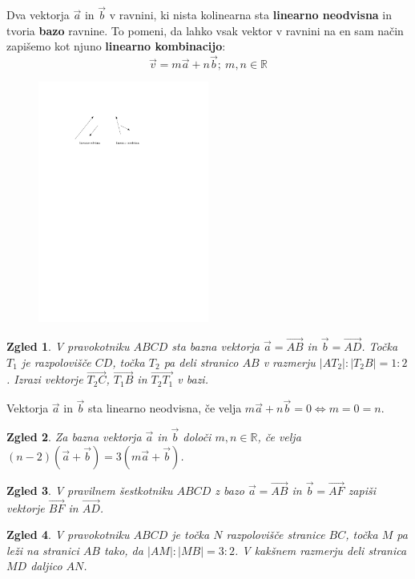 \documentclass{article}
\newtheorem*{zgled}{Zgled}
\begin{document}
Dva vektorja $\vec{a}$ in $\vec{b}$ v ravnini, ki nista kolinearna sta \textbf{linearno neodvisna} in tvoria \textbf{bazo} ravnine. To pomeni, da lahko vsak vektor v ravnini na en sam način zapišemo kot njuno \textbf{linearno kombinacijo}:
\[\vec{v}=m\vec{a}+n\vec{b};\ m,n\in\mathbb{R}\]

\begin{figure}[H]
    \includegraphics[width=0.5\textwidth]{odvisnost.pdf}
    \centering
\end{figure}

\begin{zgled}
    V pravokotniku $ABCD$ sta bazna vektorja $\vec{a}=\vec{AB}$ in $\vec{b}=\vec{AD}$. Točka $T_1$ je razpolovišče $CD$, točka $T_2$ pa deli stranico $AB$ v razmerju $|AT_2|:|T_2 B|=1:2$. Izrazi vektorje $\vec{T_2 C}$, $\vec{T_1 B}$ in $\vec{T_2 T_1}$ v bazi.
\end{zgled}

Vektorja $\vec{a}$ in $\vec{b}$ sta linearno neodvisna, če velja $m\vec{a}+n\vec{b}=0 \iff m=0=n$.

\begin{zgled}
    Za bazna vektorja $\vec{a}$ in $\vec{b}$ določi $m,n\in\mathbb{R}$, če velja $(n-2)(\vec{a}+\vec{b})=3(m\vec{a}+\vec{b})$.
\end{zgled}

\begin{zgled}
    V pravilnem šestkotniku $ABCD$ z bazo $\vec{a}=\vec{AB}$ in $\vec{b}=\vec{AF}$ zapiši vektorje $\vec{BF}$ in $\vec{AD}$.
\end{zgled}

\begin{zgled}
    V pravokotniku $ABCD$ je točka $N$ razpolovišče stranice $BC$, točka $M$ pa leži na stranici $AB$ tako, da $|AM|:|MB|=3:2$. V kakšnem razmerju deli stranica $MD$ daljico $AN$.
\end{zgled}
\end{document}

